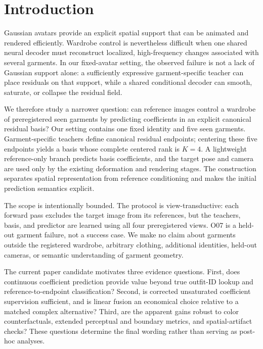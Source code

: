 \section{Introduction}

Gaussian avatars provide an explicit spatial support that can be animated and rendered efficiently. Wardrobe control is nevertheless difficult when one shared neural decoder must reconstruct localized, high-frequency changes associated with several garments. In our fixed-avatar setting, the observed failure is not a lack of Gaussian support alone: a sufficiently expressive garment-specific teacher can place residuals on that support, while a shared conditional decoder can smooth, saturate, or collapse the residual field.

We therefore study a narrower question: can reference images control a wardrobe of preregistered seen garments by predicting coefficients in an explicit canonical residual basis? Our setting contains one fixed identity and five seen garments. Garment-specific teachers define canonical residual endpoints; centering these five endpoints yields a basis whose complete centered rank is $K=4$. A lightweight reference-only branch predicts basis coefficients, and the target pose and camera are used only by the existing deformation and rendering stages. The construction separates spatial representation from reference conditioning and makes the initial prediction semantics explicit.

The scope is intentionally bounded. The protocol is view-transductive: each forward pass excludes the target image from its references, but the teachers, basis, and predictor are learned using all four preregistered views. O07 is a held-out garment failure, not a success case. We make no claim about garments outside the registered wardrobe, arbitrary clothing, additional identities, held-out cameras, or semantic understanding of garment geometry.

The current paper candidate motivates three evidence questions. First, does continuous coefficient prediction provide value beyond true outfit-ID lookup and reference-to-endpoint classification? Second, is corrected unsaturated coefficient supervision sufficient, and is linear fusion an economical choice relative to a matched complex alternative? Third, are the apparent gains robust to color counterfactuals, extended perceptual and boundary metrics, and spatial-artifact checks? These questions determine the final wording rather than serving as post-hoc analyses.

